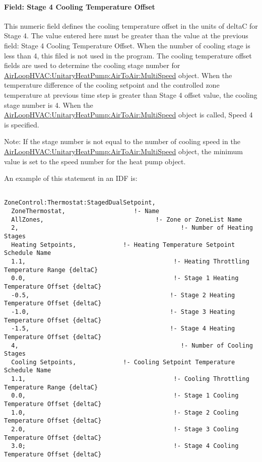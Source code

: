 \paragraph{Field: Stage 4 Cooling Temperature Offset}\label{field-stage-4-cooling-temperature-offset}

This numeric field defines the cooling temperature offset in the units of deltaC for Stage 4. The value entered here must be greater than the value at the previous field: Stage 4 Cooling Temperature Offset. When the number of cooling stage is less than 4, this filed is not used in the program. The cooling temperature offset fields are used to determine the cooling stage number for \hyperref[airloophvacunitaryheatpumpairtoairmultispeed]{AirLoopHVAC:UnitaryHeatPump:AirToAir:MultiSpeed} object. When the temperature difference of the cooling setpoint and the controlled zone temperature at previous time step is greater than Stage 4 offset value, the cooling stage number is 4. When the \hyperref[airloophvacunitaryheatpumpairtoairmultispeed]{AirLoopHVAC:UnitaryHeatPump:AirToAir:MultiSpeed} object is called, Speed 4 is specified.

Note: If the stage number is not equal to the number of cooling speed in the \hyperref[airloophvacunitaryheatpumpairtoairmultispeed]{AirLoopHVAC:UnitaryHeatPump:AirToAir:MultiSpeed} object, the minimum value is set to the speed number for the heat pump object.

An example of this statement in an IDF is:

\begin{lstlisting}

ZoneControl:Thermostat:StagedDualSetpoint,
  ZoneThermostat,                   !- Name
  AllZones,                               !- Zone or ZoneList Name
  2,                                             !- Number of Heating Stages
  Heating Setpoints,             !- Heating Temperature Setpoint Schedule Name
  1.1,                                         !- Heating Throttling Temperature Range {deltaC}
  0.0,                                         !- Stage 1 Heating Temperature Offset {deltaC}
  -0.5,                                       !- Stage 2 Heating Temperature Offset {deltaC}
  -1.0,                                       !- Stage 3 Heating Temperature Offset {deltaC}
  -1.5,                                       !- Stage 4 Heating Temperature Offset {deltaC}
  4,                                             !- Number of Cooling Stages
  Cooling Setpoints,             !- Cooling Setpoint Temperature Schedule Name
  1.1,                                         !- Cooling Throttling Temperature Range {deltaC}
  0.0,                                         !- Stage 1 Cooling Temperature Offset {deltaC}
  1.0,                                         !- Stage 2 Cooling Temperature Offset {deltaC}
  2.0,                                         !- Stage 3 Cooling Temperature Offset {deltaC}
  3.0;                                         !- Stage 4 Cooling Temperature Offset {deltaC}
\end{lstlisting}

